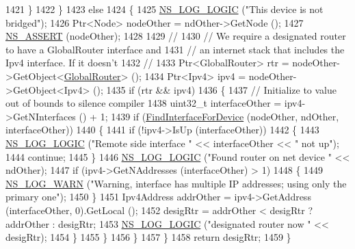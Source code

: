 \begin{DoxyCode}
1421             \}
1422         \}
1423       \textcolor{keywordflow}{else}
1424         \{
1425           \hyperlink{group__logging_ga88acd260151caf2db9c0fc84997f45ce}{NS\_LOG\_LOGIC} (\textcolor{stringliteral}{"This device is not bridged"});
1426           Ptr<Node> nodeOther = ndOther->GetNode ();
1427           \hyperlink{assert_8h_a6dccdb0de9b252f60088ce281c49d052}{NS\_ASSERT} (nodeOther);
1428 
1429           \textcolor{comment}{//}
1430           \textcolor{comment}{// We require a designated router to have a GlobalRouter interface and}
1431           \textcolor{comment}{// an internet stack that includes the Ipv4 interface.  If it doesn't}
1432           \textcolor{comment}{//}
1433           Ptr<GlobalRouter> rtr = nodeOther->GetObject<\hyperlink{classns3_1_1GlobalRouter_a778050c70fe491c0fe62b7cf6b10aaf6}{GlobalRouter}> ();
1434           Ptr<Ipv4> ipv4 = nodeOther->GetObject<Ipv4> ();
1435           \textcolor{keywordflow}{if} (rtr && ipv4)
1436             \{
1437               \textcolor{comment}{// Initialize to value out of bounds to silence compiler}
1438               uint32\_t interfaceOther = ipv4->GetNInterfaces () + 1;
1439               \textcolor{keywordflow}{if} (\hyperlink{classns3_1_1GlobalRouter_a7b30c3c09f93e3f3ac7cfe787b51d127}{FindInterfaceForDevice} (nodeOther, ndOther, interfaceOther))
1440                 \{
1441                   \textcolor{keywordflow}{if} (!ipv4->IsUp (interfaceOther))
1442                     \{
1443                       \hyperlink{group__logging_ga88acd260151caf2db9c0fc84997f45ce}{NS\_LOG\_LOGIC} (\textcolor{stringliteral}{"Remote side interface "} << interfaceOther << \textcolor{stringliteral}{" not up"});
1444                       \textcolor{keywordflow}{continue};
1445                     \}
1446                   \hyperlink{group__logging_ga88acd260151caf2db9c0fc84997f45ce}{NS\_LOG\_LOGIC} (\textcolor{stringliteral}{"Found router on net device "} << ndOther);
1447                   \textcolor{keywordflow}{if} (ipv4->GetNAddresses (interfaceOther) > 1)
1448                     \{
1449                       \hyperlink{group__logging_gade7208b4009cdf0e25783cd26766f559}{NS\_LOG\_WARN} (\textcolor{stringliteral}{"Warning, interface has multiple IP addresses; using only the
       primary one"});
1450                     \}
1451                   Ipv4Address addrOther = ipv4->GetAddress (interfaceOther, 0).GetLocal ();
1452                   desigRtr = addrOther < desigRtr ? addrOther : desigRtr;
1453                   \hyperlink{group__logging_ga88acd260151caf2db9c0fc84997f45ce}{NS\_LOG\_LOGIC} (\textcolor{stringliteral}{"designated router now "} << desigRtr);
1454                 \}
1455             \}
1456         \}
1457     \}
1458   \textcolor{keywordflow}{return} desigRtr;
1459 \}
\end{DoxyCode}


